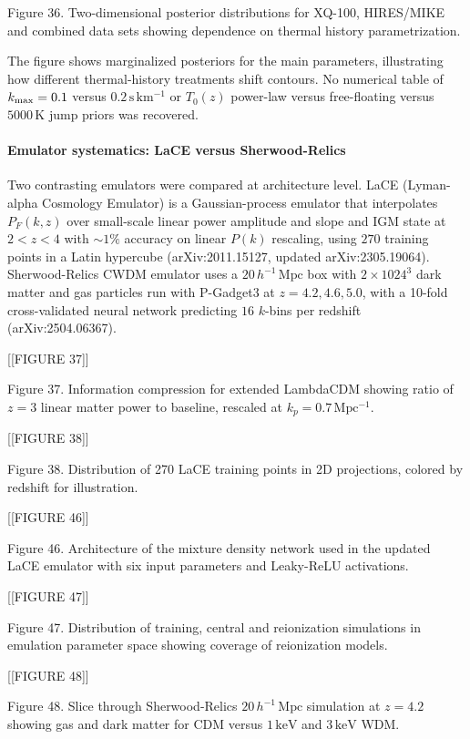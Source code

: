 \documentclass[11pt,a4paper]{article}
\begin{document}
Figure 36. Two-dimensional posterior distributions for XQ-100, HIRES/MIKE and combined data sets showing dependence on thermal history parametrization.

The figure shows marginalized posteriors for the main parameters, illustrating how different thermal-history treatments shift contours. No numerical table of $k_{\rm max} = 0.1$ versus $0.2\,\mathrm{s\,km^{-1}}$ or $T_0(z)$ power-law versus free-floating versus $5000\,\mathrm{K}$ jump priors was recovered.

\paragraph{Emulator systematics: LaCE versus Sherwood-Relics}
Two contrasting emulators were compared at architecture level. LaCE (Lyman-alpha Cosmology Emulator) is a Gaussian-process emulator that interpolates $P_F(k,z)$ over small-scale linear power amplitude and slope and IGM state at $2 < z < 4$ with $\sim 1\%$ accuracy on linear $P(k)$ rescaling, using $270$ training points in a Latin hypercube (arXiv:2011.15127, updated arXiv:2305.19064). Sherwood-Relics CWDM emulator uses a $20\,h^{-1}\,\mathrm{Mpc}$ box with $2\times1024^3$ dark matter and gas particles run with P-Gadget3 at $z = 4.2, 4.6, 5.0$, with a 10-fold cross-validated neural network predicting $16$ $k$-bins per redshift (arXiv:2504.06367).


[[FIGURE 37]]

Figure 37. Information compression for extended LambdaCDM showing ratio of $z=3$ linear matter power to baseline, rescaled at $k_p = 0.7\,\mathrm{Mpc^{-1}}$.


[[FIGURE 38]]

Figure 38. Distribution of 270 LaCE training points in 2D projections, colored by redshift for illustration.


[[FIGURE 46]]

Figure 46. Architecture of the mixture density network used in the updated LaCE emulator with six input parameters and Leaky-ReLU activations.


[[FIGURE 47]]

Figure 47. Distribution of training, central and reionization simulations in emulation parameter space showing coverage of reionization models.


[[FIGURE 48]]

Figure 48. Slice through Sherwood-Relics $20\,h^{-1}\,\mathrm{Mpc}$ simulation at $z=4.2$ showing gas and dark matter for CDM versus $1\,\mathrm{keV}$ and $3\,\mathrm{keV}$ WDM.
\end{document}
